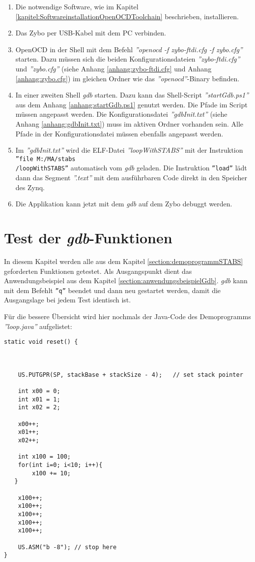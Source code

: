 \begin{enumerate}
	\item Die notwendige Software, wie im Kapitel \ref{kapitel:SoftwareinstallationOpenOCDToolchain} beschrieben, installieren.
	\item Das Zybo per USB-Kabel mit dem PC verbinden.
	\item OpenOCD in der Shell mit dem Befehl \textit{''openocd -f zybo-ftdi.cfg -f zybo.cfg''} starten.
	       Dazu müssen sich die beiden Konfigurationsdateien \textit{''zybo-ftdi.cfg''} und \textit{''zybo.cfg''} (siehe Anhang \ref{anhang:zybo-ftdi.cfg} und Anhang \ref{anhang:zybo.cfg}) im gleichen Ordner wie das \textit{''openocd''}-Binary befinden.
	\item In einer zweiten Shell \textit{gdb} starten.
	       Dazu kann das Shell-Script \textit{''startGdb.ps1''} aus dem Anhang \ref{anhang:startGdb.ps1} genutzt werden.
	       Die Pfade im Script müssen angepasst werden.
	       Die Konfigurationsdatei \textit{''gdbInit.txt''} (siehe Anhang \ref{anhang:gdbInit.txt}) muss im aktiven Ordner vorhanden sein.
	       Alle Pfade in der Konfigurationsdatei müssen ebenfalls angepasst werden.
	\item Im \textit{''gdbInit.txt''} wird die ELF-Datei \textit{''loopWithSTABS''} mit der Instruktion \texttt{''file M:/MA/stabs\\/loopWithSTABS''} automatisch vom \textit{gdb} geladen. Die Instruktion \texttt{''load''} lädt dann das Segment \textit{''.text''} mit dem ausführbaren Code direkt in den Speicher des Zynq.
	\item Die Applikation kann jetzt mit dem \textit{gdb} auf dem Zybo debuggt werden.
\end{enumerate}


\section{Test der \textit{gdb}-Funktionen}
In diesem Kapitel werden alle aus dem Kapitel \ref{section:demoprogrammSTABS} geforderten Funktionen getestet.
Als Ausgangspunkt dient das Anwendungsbeispiel aus dem Kapitel \ref{section:anwendungsbeispielGdb}.
\textit{gdb} kann mit dem Befehlt \texttt{''q''} beendet und dann neu gestartet werden, damit die Ausgangslage bei jedem Test identisch ist.


Für die bessere Übersicht wird hier nochmals der Java-Code des Demoprogramms \textit{''loop.java''} aufgelistet:
\lstset{language=java}
\begin{lstlisting}
static void reset() {



	US.PUTGPR(SP, stackBase + stackSize - 4);	// set stack pointer
	
	int x00 = 0;
	int x01 = 1;
	int x02 = 2;
	
	x00++;
	x01++;
	x02++;
	
	int x100 = 100;
	for(int i=0; i<10; i++){
		x100 += 10;
   }
		
	x100++;
	x100++;
	x100++;
	x100++;
	x100++;

	US.ASM("b -8"); // stop here
}
\end{lstlisting}


